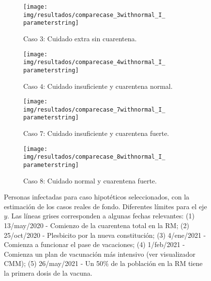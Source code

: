 \begin{figure}
     \centering
     \begin{subfigure}[b]{.47\textwidth}
         \centering
         \texttt{[image: img/resultados/comparecase\_3withnormal\_I\_\\parameterstring]}
         \caption{Caso \(3\): Cuidado extra sin cuarentena.}
     \end{subfigure}
     \hfill
     \begin{subfigure}[b]{.47\textwidth}
         \centering
         \texttt{[image: img/resultados/comparecase\_4withnormal\_I\_\\parameterstring]}
         \caption{Caso \(4\): Cuidado insuficiente y cuarentena normal.}
     \end{subfigure}
     \hfill
     \begin{subfigure}[b]{.47\textwidth}
         \centering
         \texttt{[image: img/resultados/comparecase\_7withnormal\_I\_\\parameterstring]}
         \caption{Caso \(7\): Cuidado insuficiente y cuarentena fuerte.}
     \end{subfigure}
     \hfill
     \begin{subfigure}[b]{.47\textwidth}
         \centering
         \texttt{[image: img/resultados/comparecase\_8withnormal\_I\_\\parameterstring]}
         \caption{Caso \(8\): Cuidado normal y cuarentena fuerte.}
     \end{subfigure}
        \caption[Personas infectadas para caso hipotéticos seleccionados.]{Personas infectadas para caso hipotéticos seleccionados, con la estimación de los casos reales de fondo. Diferentes límites para el eje \(y\). Las líneas grises corresponden a algunas fechas relevantes: (1) 13/may/2020 - Comienzo de la cuarentena total en la RM; (2) 25/oct/2020 - Plesbicito por la nueva constitución; (3) 4/ene/2021 - Comienza a funcionar el pase de vacaciones; (4) 1/feb/2021 - Comienza un plan de vacunación más intensivo (ver visualizador CMM); (5) 26/may/2021 - Un 50\% de la población en la RM tiene la primera dosis de la vacuna.}
        \label{img:hip-3478-I-comp}
\end{figure}

